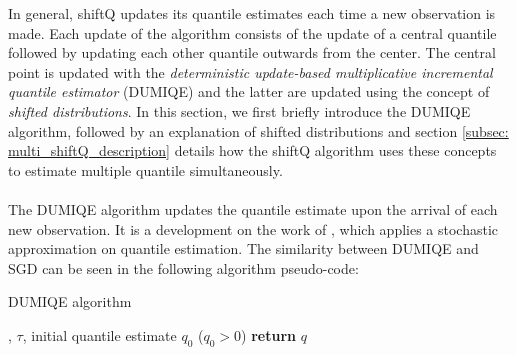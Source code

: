 In general, shiftQ updates its quantile estimates each time a new observation is made. Each update of the algorithm consists of the update of a central quantile followed by updating each other quantile outwards from the center. The central point is updated with the \emph{deterministic update-based multiplicative incremental quantile estimator} (DUMIQE) and the latter are updated using the concept of \emph{shifted distributions}. In this section, we first briefly introduce the DUMIQE algorithm, followed by an explanation of shifted distributions and section \ref{subsec: multi_shiftQ_description} details how the shiftQ algorithm uses these concepts to estimate multiple quantile simultaneously.
\\\\
The DUMIQE algorithm updates the quantile estimate upon the arrival of each new observation. It is a development on the work of \citeauthor{tierneySpaceEfficientRecursiveProcedure1983}\cite{tierneySpaceEfficientRecursiveProcedure1983}, which applies a stochastic approximation on quantile estimation. The similarity between DUMIQE and SGD can be seen in the following algorithm pseudo-code:

\begin{algorithm}
    \caption{DUMIQE algorithm}\label{alg:DUMIQE}
    \begin{algorithmic}[1]
        , $\tau$, initial quantile estimate $q_0$ ($q_0 > 0$)
                                 
                              
                \Else                           
                \EndIf
            \EndFor
        \State \textbf{return} $q$              
    \end{algorithmic}
\end{algorithm}

